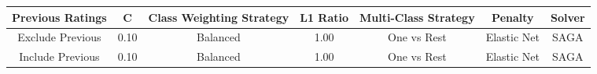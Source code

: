 \footnotesize
\begin{tabular}{ccccccc}
\toprule
Previous Ratings & C & Class Weighting Strategy & L1 Ratio & Multi-Class Strategy & Penalty & Solver \\
\midrule
Exclude Previous & 0.10 & Balanced & 1.00 & One vs Rest & Elastic Net & SAGA \\
Include Previous & 0.10 & Balanced & 1.00 & One vs Rest & Elastic Net & SAGA \\
\bottomrule
\end{tabular}

\normalsize